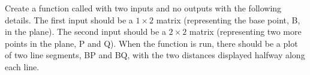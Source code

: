 {Create a function called  with two inputs and no outputs with the following details.  The first input should be a $1 \times 2$ matrix (representing the base point, B, in the plane).  The second input should be a $2 \times 2$ matrix (representing two more points in the plane, P and Q).  When the function is run, there should be a plot of two line segments, BP and BQ, with the two distances displayed halfway along each line.}
{}


